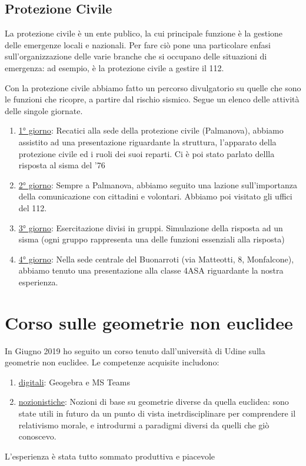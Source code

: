 \documentclass{article}
\begin{document}
  \subsection{Protezione Civile} %
  La protezione civile è un ente publico, la cui principale funzione è la gestione delle emergenze locali e nazionali. Per fare ciò pone una particolare enfasi sull'organizzazione delle varie branche che si occupano delle situazioni di emergenza: ad esempio, è la protezione civile a gestire il 112.

  Con la protezione civile abbiamo fatto un percorso divulgatorio su quelle che sono le funzioni che ricopre, a partire dal rischio sismico. Segue un elenco delle attività delle singole giornate. 
  \begin{enumerate}
    \item \underline{1° giorno}: Recatici alla sede della protezione civile (Palmanova), abbiamo assistito ad una presentazione riguardante la struttura, l'apparato della protezione civile ed i ruoli dei suoi reparti. Ci è poi stato parlato dellla risposta al sisma del '76
    \item \underline{2° giorno}: Sempre a Palmanova, abbiamo seguito una lazione sull'importanza della comunicazione con cittadini e volontari. Abbiamo poi visitato gli uffici del 112.
    \item \underline{3° giorno}: Esercitazione divisi in gruppi. Simulazione della risposta ad un sisma (ogni gruppo rappresenta una delle funzioni essenziali alla risposta)
    \item \underline{4° giorno}: Nella sede centrale del Buonarroti (via Matteotti, 8, Monfalcone), abbiamo tenuto una presentazione alla classe 4ASA riguardante la nostra esperienza.
   \end{enumerate}
   \section{Corso sulle geometrie non euclidee}
   In Giugno 2019 ho seguito un corso tenuto dall'università di Udine sulla geometrie non euclidee. Le competenze acquisite includono:
   \begin{enumerate}
     \item \underline{digitali}: Geogebra e MS Teams
     \item \underline{nozionistiche}: Nozioni di base su geometrie diverse da quella euclidea: sono state utili in futuro da un punto di vista inetrdisciplinare per comprendere il relativismo morale, e introdurmi a paradigmi diversi da quelli che giò conoscevo.
   \end{enumerate}
   L'esperienza è stata tutto sommato produttiva e piacevole
\end{document}
